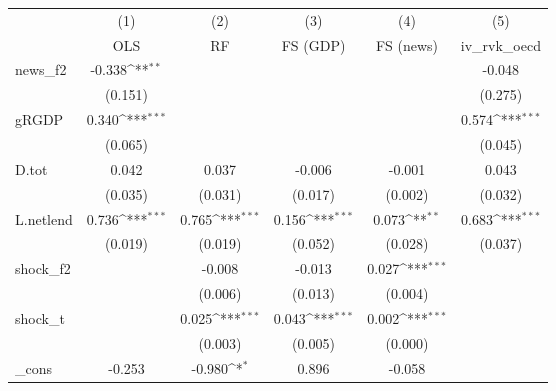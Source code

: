 {
\def\sym#1{\ifmmode^{#1}\else\(^{#1}\)\fi}
\begin{tabular}{l*{5}{c}}
\toprule
            &\multicolumn{1}{c}{(1)}&\multicolumn{1}{c}{(2)}&\multicolumn{1}{c}{(3)}&\multicolumn{1}{c}{(4)}&\multicolumn{1}{c}{(5)}\\
            &\multicolumn{1}{c}{OLS}&\multicolumn{1}{c}{RF}&\multicolumn{1}{c}{FS (GDP)}&\multicolumn{1}{c}{FS (news)}&\multicolumn{1}{c}{iv\_rvk\_oecd}\\
\midrule
news\_f2     &      -0.338\sym{**} &                     &                     &                     &      -0.048         \\
            &     (0.151)         &                     &                     &                     &     (0.275)         \\
\addlinespace
gRGDP       &       0.340\sym{***}&                     &                     &                     &       0.574\sym{***}\\
            &     (0.065)         &                     &                     &                     &     (0.045)         \\
\addlinespace
D.tot       &       0.042         &       0.037         &      -0.006         &      -0.001         &       0.043         \\
            &     (0.035)         &     (0.031)         &     (0.017)         &     (0.002)         &     (0.032)         \\
\addlinespace
L.netlend   &       0.736\sym{***}&       0.765\sym{***}&       0.156\sym{***}&       0.073\sym{**} &       0.683\sym{***}\\
            &     (0.019)         &     (0.019)         &     (0.052)         &     (0.028)         &     (0.037)         \\
\addlinespace
shock\_f2    &                     &      -0.008         &      -0.013         &       0.027\sym{***}&                     \\
            &                     &     (0.006)         &     (0.013)         &     (0.004)         &                     \\
\addlinespace
shock\_t     &                     &       0.025\sym{***}&       0.043\sym{***}&       0.002\sym{***}&                     \\
            &                     &     (0.003)         &     (0.005)         &     (0.000)         &                     \\
\addlinespace
\_cons      &      -0.253         &      -0.980\sym{*}  &       0.896         &      -0.058         &                     \\

\end{tabular}}
